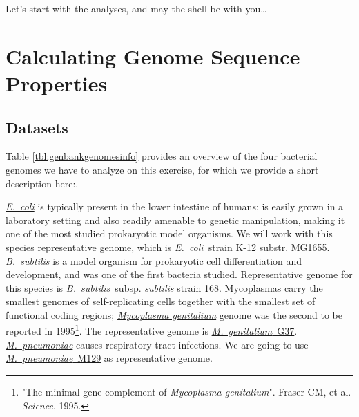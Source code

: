 \documentclass[10pt,a4paper,]{article}
\begin{document}
Let's start with the analyses, and may the shell be with you\ldots{}

\newpage

\hypertarget{calculating-genome-sequence-properties}{%
\section{Calculating Genome Sequence
Properties}\label{calculating-genome-sequence-properties}}

\hypertarget{datasets}{%
\subsection{Datasets}\label{datasets}}



Table \ref{tbl:genbankgenomesinfo} provides an overview of the four
bacterial genomes we have to analyze on this exercise, for which we
provide a short description here:.

\href{https://www.ncbi.nlm.nih.gov/genome/?term=escherichia\%20coli}{\textit{E.~coli}}
is typically present in the lower intestine of humans; is easily grown
in a laboratory setting and also readily amenable to genetic
manipulation, making it one of the most studied prokaryotic model
organisms. We will work with this species representative genome, which
is
\href{https://www.ncbi.nlm.nih.gov/genome/167?genome_assembly_id=161521}{\textit{E.~coli}~strain
K-12 substr. MG1655}.
\href{https://www.ncbi.nlm.nih.gov/genome/?term=bacillus\%20subtilis}{\textit{B.~subtilis}}
is a model organism for prokaryotic cell differentiation and
development, and was one of the first bacteria studied. Representative
genome for this species is
\href{https://www.ncbi.nlm.nih.gov/genome/665?genome_assembly_id=300274}{\textit{B.~subtilis}~subsp.
\textit{subtilis} strain 168}. Mycoplasmas carry the smallest genomes of
self-replicating cells together with the smallest set of functional
coding regions;
\href{https://www.ncbi.nlm.nih.gov/genome/?term=mycoplasma+genitalium}{\textit{Mycoplasma genitalium}}
genome was the second to be reported in
1995\footnote{"The minimal gene complement of \textit{Mycoplasma genitalium}". Fraser CM, et al. \textit{Science}, 1995.}.
The representative genome is
\href{https://www.ncbi.nlm.nih.gov/genome/474?genome_assembly_id=300158}{\textit{M.~genitalium}~G37}.
\href{https://www.ncbi.nlm.nih.gov/genome/?term=mycoplasma+pneumoniae}{\textit{M.~pneumoniae}}
causes respiratory tract infections. We are going to use
\href{https://www.ncbi.nlm.nih.gov/genome/1028?genome_assembly_id=300492}{\textit{M.~pneumoniae}~M129}
as representative genome.
\end{document}
